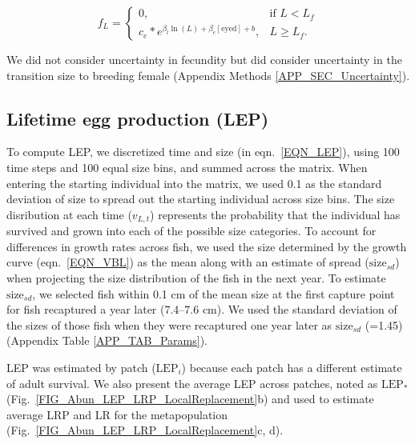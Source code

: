 \documentclass[12pt, oneside]{article}   	%
\begin{document}
\begin{equation}
f_L = 
\begin{cases}
0, & \text{if } L < L_f \\
c_e * e^{\beta_l\ln(L) + \beta_e[\text{eyed}] + b}, & L \geq L_f. \label{EQN_Fec}
\end{cases}
\end{equation}

We did not consider uncertainty in fecundity but did consider uncertainty in the transition size to breeding female (Appendix Methods \ref{APP_SEC_Uncertainty}).

\subsection{Lifetime egg production (LEP)} \label{APP_SEC_METHODS_LEP}

To compute LEP, we discretized time and size (in eqn.\ \ref{EQN_LEP}), using 100 time steps and 100 equal size bins, and summed across the matrix. When entering the starting individual into the matrix, we used 0.1 as the standard deviation of size to spread out the starting individual across size bins. The size disribution at each time ($v_{L,t}$) represents the probability that the individual has survived and grown into each of the possible size categories. To account for differences in growth rates across fish, we used the size determined by the growth curve (eqn.\ \ref{EQN_VBL}) as the mean along with an estimate of spread ($\text{size}_{sd}$) when projecting the size distribution of the fish in the next year. To estimate $\text{size}_{sd}$, we selected fish within 0.1 cm of the mean size at the first capture point for fish recaptured a year later (7.4--7.6 cm). We used the standard deviation of the sizes of those fish when they were recaptured one year later as $\text{size}_{sd}$ (=1.45) (Appendix Table \ref{APP_TAB_Params}). %

LEP was estimated by patch ($\text{LEP}_i$) because each patch has a different estimate of adult survival. We also present the average LEP across patches, noted as $\text{LEP}_*$ (Fig.\ \ref{FIG_Abun_LEP_LRP_LocalReplacement}b) and used to estimate average LRP and LR for the metapopulation (Fig.\ \ref{FIG_Abun_LEP_LRP_LocalReplacement}c, d). 
\end{document}
